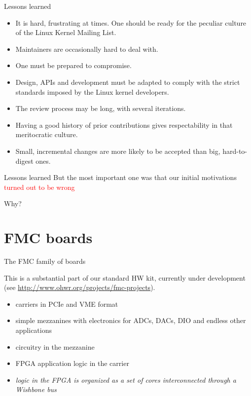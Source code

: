 \documentclass[compress,red]{beamer}
\begin{document}
\begin{frame}{Lessons learned}
\begin{itemize}
\item It is hard, frustrating at times. One should be ready for the
    peculiar culture of the Linux Kernel Mailing List.
\item Maintainers are occasionally hard to deal with.
\item One must be prepared to compromise.
\item Design, APIs and development must be adapted to comply with the strict
    standards imposed by the Linux kernel developers.
\item The review process may be long, with several iterations.
\item Having a good history of prior contributions gives respectability
    in that meritocratic culture.
\item Small, incremental changes are more likely to be accepted than
    big, hard-to-digest ones.
\end{itemize}
\end{frame}

\begin{frame}{Lessons learned}
But the most important one was that our initial motivations
\pause
\textcolor{red}{turned out to be wrong}

\pause
\begin{center}
\Huge Why?
\end{center}
\end{frame}

\section{FMC boards}

\begin{frame}{The FMC family of boards}

This is a substantial part of our standard HW kit, currently under
development\\
(see \url{http://www.ohwr.org/projects/fmc-projects}).

\begin{itemize}
\item carriers in PCIe and VME format
\item simple mezzanines with electronics for ADCs, DACs, DIO and endless
    other applications
\item circuitry in the mezzanine
\item FPGA application logic in the carrier
\item \emph{logic in the FPGA is organized as a set of cores
    interconnected through a Wishbone bus}
\end{itemize}
\end{frame}
\end{document}
